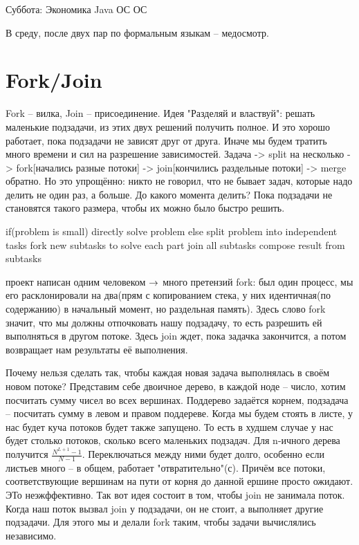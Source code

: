 Суббота:
Экономика
Java
ОС
ОС

В среду, после двух пар по формальным языкам -- медосмотр.

\section{Fork/Join}
Fork -- вилка, Join -- присоединение.
Идея "Разделяй и властвуй": решать маленькие подзадачи, из этих двух решений получить полное.
И это хорошо работает, пока подзадачи не зависят друг от друга. Иначе мы будем тратить много времени и сил на разрешение зависимостей.
Задача -> split на несколько -> fork[начались разные потоки] -> join[кончились раздельные потоки] -> merge обратно.
Но это упрощённо: никто не говорил, что не бывает задач, которые надо делить не один раз, а больше. 
До какого момента делить? Пока подзадачи не становятся такого размера, чтобы их можно было быстро решить.
\begin{javacode}
if(problem is small) {
	directly solve problem
} else {
	split problem into independent tasks
	fork new subtasks to solve each part
	join all subtasks
	compose result from subtasks
}
\end{javacode} 
проект написан одним человеком $\rightarrow$ много претензий
fork: был один процесс, мы его расклонировали на два(прям с копированием стека, у них идентичная(по содержанию) в начальный момент, но раздельная память).
Здесь слово fork значит, что мы должны отпочковать нашу подзадачу, то есть разрешить ей выполняться в другом потоке.
Здесь join ждет, пока задачка закончится, а потом возвращает нам результаты её выполнения.

Почему нельзя сделать так, чтобы каждая новая задача выполнялась в своём новом потоке?
Представим себе двоичное дерево, в каждой ноде -- число, хотим посчитать сумму чисел во всех вершинах.
Поддерево задаётся корнем, подзадача -- посчитать сумму в левом и правом поддереве.
Когда мы будем стоять в листе, у нас будет куча потоков будет также запущено.
То есть в худшем случае у нас будет столько потоков, сколько всего маленьких подзадач. 
Для n-ичного дерева получится $\frac{N^{L + 1} - 1}{N - 1}$. 
Переключаться между ними будет долго, особенно если листьев много -- в общем, работает "отвратительно"(с).
Причём все потоки, соответствующие вершинам на пути от корня до данной ершине просто ожидают. ЭТо неэжффективно.
Так вот идея состоит в том, чтобы join не занимала поток.
Когда наш поток вызвал join у подзадачи, он не стоит, а выполняет другие подзадачи.
Для этого мы и делали fork таким, чтобы задачи вычислялись независимо.

